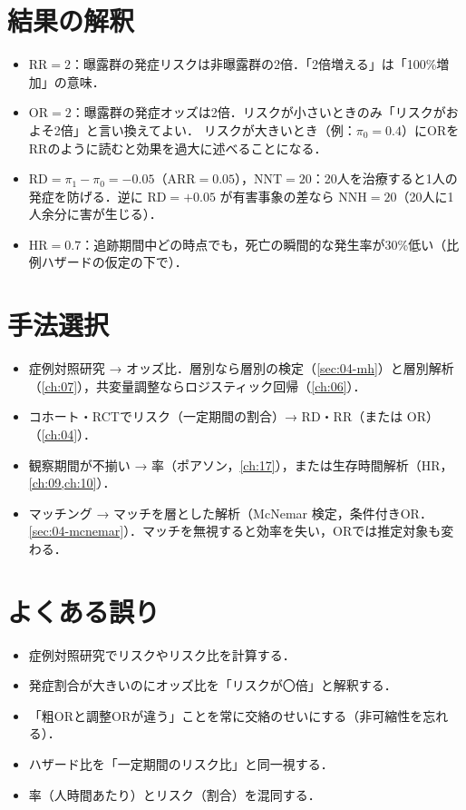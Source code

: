 \documentclass[a4paper,11pt,openany]{ltjsbook}
\newcommand{\RR}{\mathrm{RR}}
\newcommand{\RD}{\mathrm{RD}}
\newcommand{\OR}{\mathrm{OR}}
\newcommand{\HR}{\mathrm{HR}}
\begin{document}
\section{結果の解釈}\label{sec:02-interp}
\begin{itemize}
\item $\RR=2$：曝露群の発症リスクは非曝露群の2倍．「2倍増える」は「100\%増加」の意味．
\item $\OR=2$：曝露群の発症オッズは2倍．リスクが小さいときのみ「リスクがおよそ2倍」と言い換えてよい．
      リスクが大きいとき（例：$\pi_0=0.4$）にORをRRのように読むと効果を過大に述べることになる．
\item $\RD=\pi_1-\pi_0=-0.05$（$\mathrm{ARR}=0.05$），$\mathrm{NNT}=20$：20人を治療すると1人の発症を防げる．逆に $\RD=+0.05$ が有害事象の差なら $\mathrm{NNH}=20$（20人に1人余分に害が生じる）．
\item $\HR=0.7$：追跡期間中どの時点でも，死亡の瞬間的な発生率が30\%低い（比例ハザードの仮定の下で）．
\end{itemize}

\section{手法選択}\label{sec:02-choice}
\begin{itemize}
\item 症例対照研究 → オッズ比．層別なら層別の検定（\cref{sec:04-mh}）と層別解析（\cref{ch:07}），共変量調整ならロジスティック回帰（\cref{ch:06}）．
\item コホート・RCTでリスク（一定期間の割合）→ RD・RR（または OR）（\cref{ch:04}）．
\item 観察期間が不揃い → 率（ポアソン，\cref{ch:17}），または生存時間解析（HR，\cref{ch:09,ch:10}）．
\item マッチング → マッチを層とした解析（McNemar 検定，条件付きOR．\cref{sec:04-mcnemar}）．マッチを無視すると効率を失い，ORでは推定対象も変わる．
\end{itemize}

\section{よくある誤り}\label{sec:02-err}
\begin{warnbox}
\begin{itemize}
\item 症例対照研究でリスクやリスク比を計算する．
\item 発症割合が大きいのにオッズ比を「リスクが〇倍」と解釈する．
\item 「粗ORと調整ORが違う」ことを常に交絡のせいにする（非可縮性を忘れる）．
\item ハザード比を「一定期間のリスク比」と同一視する．
\item 率（人時間あたり）とリスク（割合）を混同する．
\end{itemize}
\end{warnbox}
\end{document}
